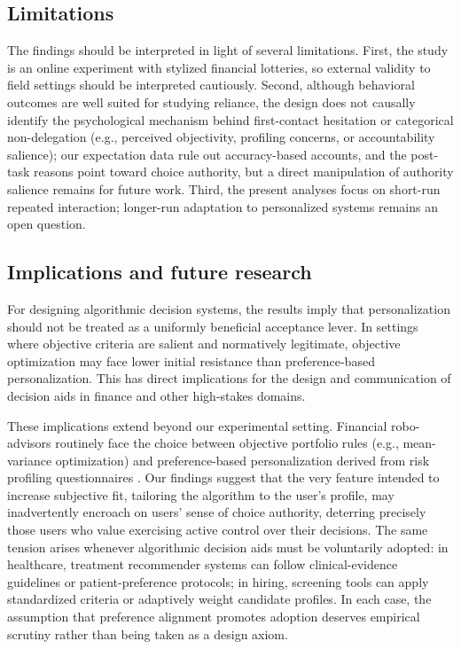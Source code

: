 \documentclass[a4paper, 12pt, fleqn]{article}
\theoremstyle{definition}
\begin{document}
\subsection{Limitations}
The findings should be interpreted in light of several limitations. First, the study is an online experiment with stylized financial lotteries, so external validity to field settings should be interpreted cautiously. Second, although behavioral outcomes are well suited for studying reliance, the design does not causally identify the psychological mechanism behind first-contact hesitation or categorical non-delegation (e.g., perceived objectivity, profiling concerns, or accountability salience); our expectation data rule out accuracy-based accounts, and the post-task reasons point toward choice authority, but a direct manipulation of authority salience remains for future work. Third, the present analyses focus on short-run repeated interaction; longer-run adaptation to personalized systems remains an open question.

\subsection{Implications and future research}
For designing algorithmic decision systems, the results imply that personalization should not be treated as a uniformly beneficial acceptance lever. In settings where objective criteria are salient and normatively legitimate, objective optimization may face lower initial resistance than preference-based personalization. This has direct implications for the design and communication of decision aids in finance and other high-stakes domains.

These implications extend beyond our experimental setting. Financial robo-advisors routinely face the choice between objective portfolio rules (e.g., mean-variance optimization) and preference-based personalization derived from risk profiling questionnaires \citep{Capponi2022,Ruehr2020}. Our findings suggest that the very feature intended to increase subjective fit, tailoring the algorithm to the user's profile, may inadvertently encroach on users' sense of choice authority, deterring precisely those users who value exercising active control over their decisions. The same tension arises whenever algorithmic decision aids must be voluntarily adopted: in healthcare, treatment recommender systems can follow clinical-evidence guidelines or patient-preference protocols; in hiring, screening tools can apply standardized criteria or adaptively weight candidate profiles. In each case, the assumption that preference alignment promotes adoption deserves empirical scrutiny rather than being taken as a design axiom.
\end{document}
